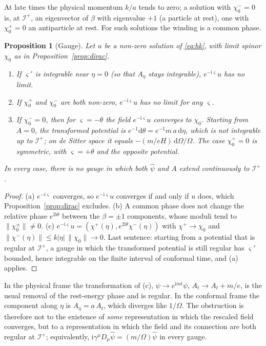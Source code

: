 \documentclass[11pt,a4paper]{article}
\newtheorem{proposition}{Proposition}
\theoremstyle{definition}
\newcommand{\scri}{\mathscr{I}^{+}}
\newcommand{\dd}{\mathrm{d}}
\newcommand{\ii}{\mathrm{i}}
\newcommand{\hpsi}{\hat\psi}
\begin{document}
At late times the physical momentum $k/a$ tends to zero; a solution with $\chi_{0}^{-}=0$ is, at $\scri$, an eigenvector of $\beta$ with eigenvalue $+1$ (a particle at rest), one with $\chi_{0}^{+}=0$ an antiparticle at rest. For such solutions the winding is a common phase.

\begin{proposition}[Gauge]
\label{prop:gauge}
Let $u$ be a non-zero solution of \eqref{eq:hk}, with limit spinor $\chi_{0}$ as in Proposition~\ref{prop:dirac}.
\begin{enumerate}[label=(\alph*)]
\item If $\varsigma'$ is integrable near $\eta=0$ (so that $A_{\eta}$ stays integrable), $e^{-\ii\varsigma}u$ has no limit.
\item If $\chi_{0}^{+}$ and $\chi_{0}^{-}$ are both non-zero, $e^{-\ii\varsigma}u$ has no limit for any $\varsigma$.
\item If $\chi_{0}^{-}=0$, then for $\varsigma=-\theta$ the field $e^{-\ii\varsigma}u$ converges to $\chi_{0}$. Starting from $A=0$, the transformed potential is $e^{-1}\dd\theta=e^{-1}m\,a\,\dd\eta$, which is not integrable up to $\scri$; on de Sitter space it equals $-(m/eH)\,\dd\Omega/\Omega$. The case $\chi_{0}^{+}=0$ is symmetric, with $\varsigma=+\theta$ and the opposite potential.
\end{enumerate}
In every case, there is no gauge in which both $\hpsi$ and $A$ extend continuously to $\scri$.
\end{proposition}
\begin{proof}
(a) $e^{-\ii\varsigma}$ converges, so $e^{-\ii\varsigma}u$ converges if and only if $u$ does, which Proposition~\ref{prop:dirac} excludes. (b) A common phase does not change the relative phase $e^{2\ii\theta}$ between the $\beta=\pm1$ components, whose moduli tend to $\|\chi_{0}^{\pm}\|\neq0$. (c) $e^{-\ii\varsigma}u=(\chi^{+}(\eta),e^{2\ii\theta}\chi^{-}(\eta))$ with $\chi^{+}\to\chi_{0}$ and $\|\chi^{-}(\eta)\|\le k|\eta|\,\|\chi_{0}\|\to0$. Last sentence: starting from a potential that is regular at $\scri$, a gauge in which the transformed potential is still regular has $\varsigma'$ bounded, hence integrable on the finite interval of conformal time, and (a) applies.
\end{proof}

In the physical frame the transformation of (c), $\psi\to e^{\ii mt}\psi$, $A_{t}\to A_{t}+m/e$, is the usual removal of the rest-energy phase and is regular. In the conformal frame the component along $\eta$ is $A_{\eta}=a\,A_{t}$, which diverges like $1/\Omega$. The obstruction is therefore not to the existence of \emph{some} representation in which the rescaled field converges, but to a representation in which the field and its connection are both regular at $\scri$; equivalently, $\ii\gamma^{\mu}D_{\mu}\hpsi=(m/\Omega)\hpsi$ in every gauge.
\end{document}
